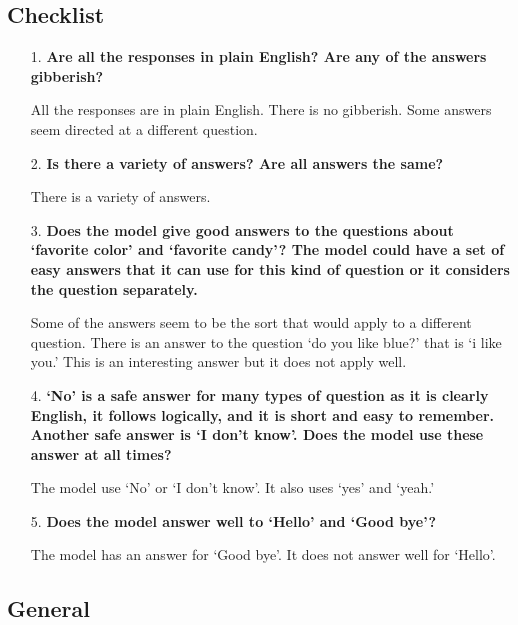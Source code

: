 \subsection{Checklist}


\begin{itemize}
	\item [1.] \textbf{Are all the responses in plain English? Are any of the answers gibberish?}
	
	\item []All the responses are in plain English. There is no gibberish. Some answers seem directed at a different question.
	
	\item [2.] \textbf{Is there a  variety of answers? Are all answers the same?}
	
	\item []There is a variety of answers. 
	
	\item [3.] \textbf{Does the model give good answers to the questions about `favorite color' and `favorite candy'? The model could have a set of easy answers that it can use for this kind of question or it considers the question separately.} 
	
	\item []Some of the answers seem to be the sort that would apply to a different question. There is an answer to the question `do you like blue?' that is `i like you.' This is an interesting answer but it does not apply well.
	
	\item [4.] \textbf{`No' is a safe answer for many types of question as it is clearly English, it follows logically, and it is short and easy to remember. Another safe answer is `I don't know'. Does the model use these answer at all times?}
	
	\item []The model use `No' or `I don't know'. It also uses `yes' and `yeah.'
	
	\item [5.] \textbf{Does the model answer well to `Hello' and `Good bye'?}
	
	\item []The model has an answer for `Good bye'. It does not answer well for `Hello'.
	
\end{itemize}

\subsection{General}

